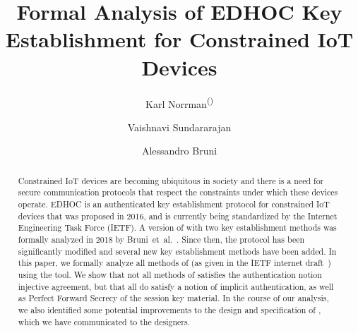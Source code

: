 \documentclass[runningheads, envcountsame, hidelinks, a4paper, draft, x11names]{llncs}
\begin{document}
\title{Formal Analysis of EDHOC Key Establishment for Constrained IoT Devices}
\author{Karl Norrman\textsuperscript{(\Letter)}
\and
    Vaishnavi Sundararajan
\and
    Alessandro Bruni
}

%
%
\authorrunning{}
%
%
\maketitle
%

\begin{abstract}
Constrained IoT devices are becoming ubiquitous in society
and there is a need for secure communication protocols that respect the
constraints under which these devices operate.
%
EDHOC is an authenticated key establishment protocol for constrained IoT
devices that was proposed in 2016, and is currently being standardized by the
Internet Engineering Task Force (IETF).
%
A version of \mEdhoc{} with two key establishment methods was formally analyzed
in 2018 by Bruni~et~al.~\cite{DBLP:conf/secsr/BruniJPS18}.
%
Since then, the protocol has been significantly modified and several new key
establishment methods have been added.
%
In this paper, we formally analyze all methods of \mEdhoc{} (as given in
the IETF internet draft~\cite{our-analysis-selander-lake-edhoc-00}) using the
\mTamarin{} tool.
%
We show that not all methods of \mEdhoc{} satisfies the authentication notion
injective agreement, but that all do satisfy a notion of implicit
authentication, as well as Perfect Forward Secrecy of the session key material.
%
In the course of our analysis, we also identified some potential improvements to the
design and specification of \mEdhoc, which we have communicated to
the designers.
%
\end{abstract}
%

\end{document}
